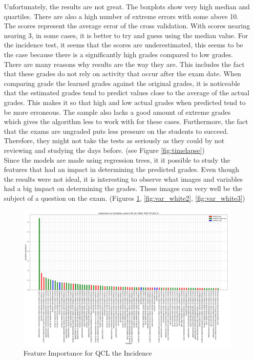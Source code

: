 \documentclass[a4paper,11pt]{report}
\numberwithin{figure}{chapter} %
\begin{document}
    Unfortunately, the results are not great.
    The boxplots show very high median and quartiles.
    There are also a high number of extreme errors with some above 10.
    The scores represent the average error of the cross validation.
    With scores nearing nearing 3, in some cases, it is better to try and guess using the median value.
    For the incidence test, it seems that the scores are underestimated, this seems to be the case because there is a significantly high grades compared to low grades.
    There are many reasons why results are the way they are.
    This includes the fact that these grades do not rely on activity that occur after the exam date.
    When comparing grade the learned grades against the original grades, it is noticeable that the estimated grades tend to predict values close to the average of the actual grades.
    This makes it so that high and low actual grades when predicted tend to be more erroneous.
    The sample also lacks a good amount of extreme grades which gives the algorithm less to work with for these cases.
    Furthermore, the fact that the exams are ungraded puts less pressure on the students to succeed.
    Therefore, they might not take the tests as seriously as they could by not reviewing and studying the days before. (see Figure \ref{fig:timelapse}) \\


  Since the models are made using regression trees, it it possible to study the features that had an impact in determining the predicted grades.
  Even though the results were not ideal, it is interesting to observe what images and variables had a big impact on determining the grades.
  These images can very well be the subject of a question on the exam. (Figures \ref{fig:var_white1}, \ref{fig:var_white2}, \ref{fig:var_white3})

     \begin{figure}[H]
      \centering
      \includegraphics[width=.95\linewidth]{plots/var_importance_TRIAL_TEST_TP_QCL_IC_2018-04-29_14_31_17.png}
      \caption{Feature Importance for QCL the Incidence}
      \label{fig:var_white1}
      \end{figure}
\end{document}

